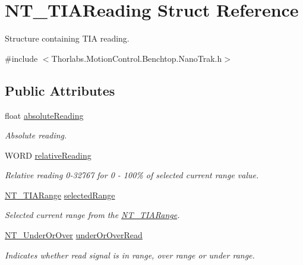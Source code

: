 \hypertarget{struct_n_t___t_i_a_reading}{}\section{N\+T\+\_\+\+T\+I\+A\+Reading Struct Reference}
\label{struct_n_t___t_i_a_reading}


Structure containing T\+IA reading.  




{\ttfamily \#include $<$Thorlabs.\+Motion\+Control.\+Benchtop.\+Nano\+Trak.\+h$>$}

\subsection*{Public Attributes}
\begin{DoxyCompactItemize}
\item 
float \hyperlink{struct_n_t___t_i_a_reading_ac0e14181a77812ec8572ba673579e24a}{absolute\+Reading}
\begin{DoxyCompactList}\small\item\em Absolute reading. \end{DoxyCompactList}\item 
W\+O\+RD \hyperlink{struct_n_t___t_i_a_reading_a39e53db8dcb7ce3f72bf55a2e82b037c}{relative\+Reading}
\begin{DoxyCompactList}\small\item\em Relative reading 0-\/32767 for 0 -\/ 100\% of selected current range value. \end{DoxyCompactList}\item 
\hyperlink{group___common_ga2d700cb6733eb95975d787fb1915a74b}{N\+T\+\_\+\+T\+I\+A\+Range} \hyperlink{struct_n_t___t_i_a_reading_a738748f2e9f07ad0e1539a1ac374f827}{selected\+Range}
\begin{DoxyCompactList}\small\item\em Selected current range from the \hyperlink{group___common_ga2d700cb6733eb95975d787fb1915a74b}{N\+T\+\_\+\+T\+I\+A\+Range}. \end{DoxyCompactList}\item 
\hyperlink{group___common_ga6808283e2ba5d730e44e28ca096d7766}{N\+T\+\_\+\+Under\+Or\+Over} \hyperlink{struct_n_t___t_i_a_reading_a1948194bb6ed2ee743f7920f2ed5c448}{under\+Or\+Over\+Read}
\begin{DoxyCompactList}\small\item\em Indicates whether read signal is in range, over range or under range. \end{DoxyCompactList}\end{DoxyCompactItemize}


